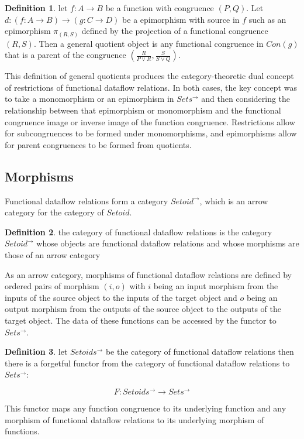 \documentclass[a4paper,11pt, notitlepage]{report}
\theoremstyle{definition}
\newtheorem{definition}{Definition}[section]
\begin{document}
\begin{definition}
let $f: A \to B$ be a function with congruence $(P,Q)$. Let $d: (f : A \to B) \to (g: C \to D)$ be a epimorphism with source in $f$ such as an epimorphism $\pi_{(R,S)}$ defined by the projection of a functional congruence $(R,S)$. Then a general quotient object is any functional congruence in $Con(g)$ that is a parent of the congruence $(\frac{R}{P \vee R}, \frac{S}{S \vee Q})$.
\end{definition}

This definition of general quotients produces the category-theoretic dual concept of restrictions of functional dataflow relations. In both cases, the key concept was to take a monomorphism or an epimorphism in $Sets^{\to}$ and then considering the relationship between that epimorphism or monomorphism and the functional congruence image or inverse image of the function congruence. Restrictions allow for subcongruences to be formed under monomorphisms, and epimorphisms allow for parent congruences to be formed from quotients.

\newpage

\subsection{Morphisms}
Functional dataflow relations form a category $Setoid^{\to}$, which is an arrow category for the category of $Setoid$.

\begin{definition}
the category of functional dataflow relations is the category $Setoid^{\to}$ whose objects are functional dataflow relations and whose morphisms are those of an arrow category
\end{definition}

As an arrow category, morphisms of functional dataflow relations are defined by ordered pairs of morphism $(i,o)$ with $i$ being an input morphism from the inputs of the source object to the inputs of the target object and $o$ being an output morphism from the outputs of the source object to the outputs of the target object. The data of these functions can be accessed by the functor to $Sets^{\to}$.

\begin{definition}
let $Setoids^{\to}$ be the category of functional dataflow relations then there is a forgetful functor from the category of functional dataflow relations to $Sets^{\to}$:

\[ F: Setoids^{\to} \to Sets^{\to} \]

This functor maps any function congruence to its underlying function and any morphism of functional dataflow relations to its underlying morphism of functions.
\end{definition}
\end{document}
